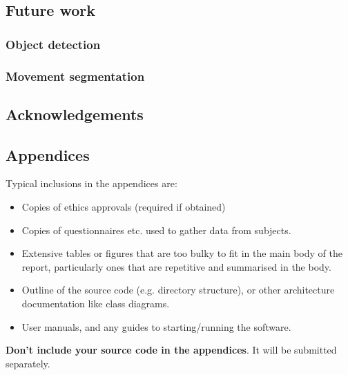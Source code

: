 \documentclass{l4proj}
\begin{document}
\section{Future work}

\subsection{Object detection}

\subsection{Movement segmentation}

\section{Acknowledgements}

%
% 

\begin{appendices}

\chapter{Appendices}

Typical inclusions in the appendices are:

\begin{itemize}
\item
  Copies of ethics approvals (required if obtained)
\item
  Copies of questionnaires etc. used to gather data from subjects.
\item
  Extensive tables or figures that are too bulky to fit in the main body of
  the report, particularly ones that are repetitive and summarised in the body.

\item Outline of the source code (e.g. directory structure), or other architecture documentation like class diagrams.

\item User manuals, and any guides to starting/running the software.

\end{itemize}

\textbf{Don't include your source code in the appendices}. It will be
submitted separately.

\end{appendices}






\end{document}
